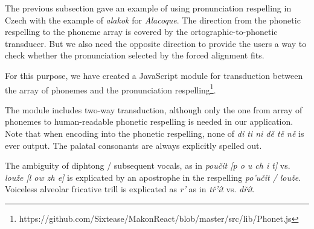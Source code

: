 \documentclass{itatnew}
\begin{document}
The previous subsection gave an example of using pronunciation respelling in
Czech with the example of {\em alakok} for {\em Alacoque}. The direction from
the phonetic respelling to the phoneme array is covered by the
ortographic-to-phonetic transducer. But we also need the opposite direction to
provide the users a way to check whether the pronunciation selected by the
forced alignment fits.

For this purpose, we have created a JavaScript module for transduction between
the array of phonemes and the pronunciation
respelling\footnote{https://github.com/Sixtease/MakonReact/blob/master/src/lib/Phonet.js}.

The module includes two-way transduction, although only the one from array of
phonemes to human-readable phonetic respelling is needed in our application.
Note that when encoding into the phonetic respelling, none of
{\em di ti ni dě tě ně} is ever output. The palatal consonants are always
explicitly spelled out.

The ambiguity of diphtong / subsequent vocals, as in {\em poučit [p o u ch i t]}
vs. {\em louže [l ow zh e]} is explicated by an apostrophe in the respelling
{\em po'učit / louže}. Voiceless alveolar fricative trill is explicated as {\em
r'} as in {\em tř'ít} vs. {\em dřít}.
\end{document}
